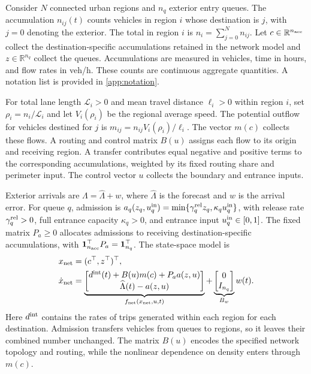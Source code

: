 \documentclass[preprint,12pt]{elsarticle}
\theoremstyle{definition}
\theoremstyle{plain}
\theoremstyle{definition}
\theoremstyle{plain}
\newcommand{\R}{\mathbb{R}}
\newcommand{\appref}[1]{\ref{#1}}
\begin{document}
Consider $N$ connected urban regions and $n_q$ exterior entry queues.
The accumulation $n_{ij}(t)$ counts vehicles in region $i$ whose destination
is $j$, with $j=0$ denoting the exterior. The total in region $i$ is
$n_i=\sum_{j=0}^{N}n_{ij}$. Let $c\in\R^{n_{\rm acc}}$ collect the
destination-specific accumulations retained in the network model and
$z\in\R^{n_q}$ collect the queues. Accumulations are measured in vehicles,
time in hours, and flow rates in veh/h. These counts are continuous
aggregate quantities. A notation list is provided in \appref{app:notation}.

For total lane length $\mathcal L_i>0$ and mean travel distance
$\ell_i>0$ within region $i$, set $\rho_i=n_i/\mathcal L_i$ and let
$V_i(\rho_i)$ be the regional average speed. The potential outflow for
vehicles destined for $j$ is $m_{ij}=n_{ij}V_i(\rho_i)/\ell_i$.
The vector $m(c)$ collects these flows. A routing and control matrix
$B(u)$ assigns each flow to its origin and receiving region. A transfer
contributes equal negative and positive terms to the corresponding
accumulations, weighted by its fixed routing share and perimeter input.
The control vector $u$ collects the boundary and entrance inputs.

Exterior arrivals are $\Lambda=\widehat\Lambda+w$, where
$\widehat\Lambda$ is the forecast and $w$ is the arrival error.
For queue $q$, admission is
$a_q(z_q,u_q^{\rm in})=\min\{\gamma_q^{\rm rel}z_q,\kappa_q u_q^{\rm in}\}$,
with release rate $\gamma_q^{\rm rel}>0$, full entrance capacity
$\kappa_q>0$, and entrance input $u_q^{\rm in}\in[0,1]$.
The fixed matrix $P_a\ge0$ allocates admissions to receiving
destination-specific accumulations, with
$\mathbf1_{n_{\rm acc}}^\top P_a=\mathbf1_{n_q}^\top$.
The state-space model is
\begin{equation}
\begin{aligned}
x_{\rm net}&=(c^\top,z^\top)^\top,\\
\dot x_{\rm net}
&=\underbrace{\begin{bmatrix}
d^{\rm int}(t)+B(u)m(c)+P_a a(z,u)\\
\widehat\Lambda(t)-a(z,u)
\end{bmatrix}}_{f_{\rm net}(x_{\rm net},u,t)}
+\underbrace{\begin{bmatrix}0\\I_{n_q}\end{bmatrix}}_{B_w}w(t).
\end{aligned}
\label{eq:network-state-space}
\end{equation}
Here $d^{\rm int}$ contains the rates of trips generated within each
region for each destination. Admission transfers vehicles from queues to
regions, so it leaves their combined number unchanged. The matrix $B(u)$
encodes the specified network topology and routing, while the nonlinear
dependence on density enters through $m(c)$.
\end{document}
